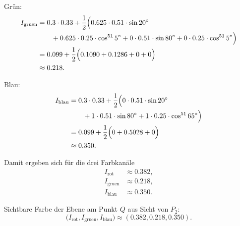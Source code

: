 \documentclass[11pt,a4paper]{article}
\begin{document}
Grün:
\[
\begin{aligned}
I_{\mathrm{gruen}}
&= 0.3 \cdot 0.33
 + \frac{1}{2}\Bigl(
 0.625 \cdot 0.51 \cdot \sin 20^\circ \\
&\qquad + 0.625 \cdot 0.25 \cdot \cos^{51} 5^\circ
 + 0 \cdot 0.51 \cdot \sin 80^\circ
 + 0 \cdot 0.25 \cdot \cos^{51} 5^\circ
\Bigr) \\
&= 0.099
 + \frac{1}{2}\Bigl(0.1090 + 0.1286 + 0 + 0\Bigr) \\
&\approx 0.218.
\end{aligned}
\]

Blau:
\[
\begin{aligned}
I_{\mathrm{blau}}
&= 0.3 \cdot 0.33
 + \frac{1}{2}\Bigl(
 0 \cdot 0.51 \cdot \sin 20^\circ \\
&\qquad + 1 \cdot 0.51 \cdot \sin 80^\circ
 + 1 \cdot 0.25 \cdot \cos^{51} 65^\circ
\Bigr) \\
&= 0.099
 + \frac{1}{2}\Bigl(0 + 0.5028 + 0\Bigr) \\
&\approx 0.350.
\end{aligned}
\]

Damit ergeben sich für die drei Farbkanäle
\[
\begin{aligned}
I_{\mathrm{rot}} &\approx 0.382, \\
I_{\mathrm{gruen}} &\approx 0.218, \\
I_{\mathrm{blau}} &\approx 0.350.
\end{aligned}
\]

Sichtbare Farbe der Ebene am Punkt $Q$ aus Sicht von $P_2$:
\[
\bigl(I_{\mathrm{rot}}, I_{\mathrm{gruen}}, I_{\mathrm{blau}}\bigr)
\approx (0.382, 0.218, 0.350).
\]
\end{document}
